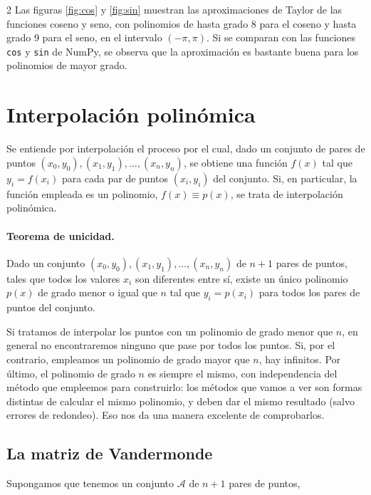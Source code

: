 \begin{paracol}{2}
Las figuras \ref{fig:cos} y \ref{fig:sin} muestran las aproximaciones de Taylor de las funciones coseno y seno, con polinomios de hasta grado 8 para el coseno y hasta grado 9 para el seno, en el intervalo $(-\pi, \pi)$. Si se comparan con las funciones \texttt{cos} y \texttt{sin} de NumPy, se observa que la aproximación es bastante buena para los polinomios de mayor grado.

\section{Interpolación polinómica}

Se entiende por interpolación el proceso por el cual, dado un conjunto de pares de puntos $(x_0,y_0),(x_1,y_1),\dots, (x_n,y_n)$, se obtiene una función $f(x)$ tal que $y_i=f(x_i)$ para cada par de puntos $(x_i,y_i)$ del conjunto. Si, en particular, la función empleada es un polinomio, $f(x)\equiv p(x)$, se trata de interpolación polinómica. 

\paragraph{Teorema de unicidad.}  Dado un conjunto $(x_0,y_0),(x_1,y_1),\dots, (x_n,y_n)$ de $n+1$ pares de puntos, tales que todos los valores $x_i$ son diferentes entre sí, existe un único polinomio $p(x)$ de grado menor o igual que $n$ tal que $y_i=p(x_i)$ para todos los pares de puntos del conjunto.

Si tratamos de interpolar los puntos con un polinomio de grado menor que $n$, en general no encontraremos ninguno que pase por todos los puntos. Si, por el contrario, empleamos un polinomio de grado mayor que $n$, hay infinitos. Por último, el polinomio de grado $n$ es siempre el mismo, con independencia del método que empleemos para construirlo: los métodos que vamos a ver son formas distintas de calcular el mismo polinomio, y deben dar el mismo resultado (salvo errores de redondeo). Eso nos da una manera excelente de comprobarlos.

\subsection{La matriz de Vandermonde} 
Supongamos que tenemos un conjunto $\mathcal{A}$ de $n+1$ pares de puntos,


\end{paracol}
